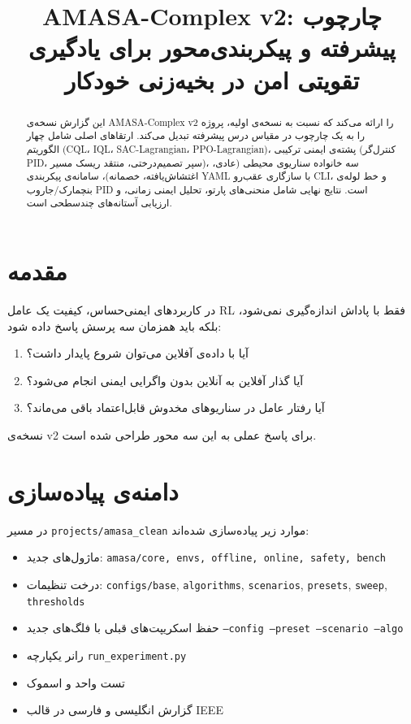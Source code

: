 \documentclass[conference]{IEEEtran}
\title{AMASA-Complex v2: چارچوب پیشرفته و پیکربندی‌محور برای یادگیری تقویتی امن در بخیه‌زنی خودکار}
\author{
\IEEEauthorblockN{Codex}
\IEEEauthorblockA{\texttt{/Users/tahamajs/Documents/uni/DRL/projects/amasa\_clean}}
}
\begin{document}
\maketitle

\begin{abstract}
این گزارش نسخه‌ی AMASA-Complex v2 را ارائه می‌کند که نسبت به نسخه‌ی اولیه، پروژه را به یک چارچوب در مقیاس درس پیشرفته تبدیل می‌کند. ارتقاهای اصلی شامل چهار الگوریتم (CQL، IQL، SAC-Lagrangian، PPO-Lagrangian)، پشته‌ی ایمنی ترکیبی (کنترل‌گر PID، سپر تصمیم‌درختی، منتقد ریسک مسیر)، سه خانواده سناریوی محیطی (عادی، اغتشاش‌یافته، خصمانه)، سامانه‌ی پیکربندی YAML با سازگاری عقب‌رو CLI، و خط لوله‌ی بنچمارک/جاروب PID است. نتایج نهایی شامل منحنی‌های پارتو، تحلیل ایمنی زمانی، و ارزیابی آستانه‌های چندسطحی است.
\end{abstract}

\section{مقدمه}
در کاربردهای ایمنی‌حساس، کیفیت یک عامل RL فقط با پاداش اندازه‌گیری نمی‌شود، بلکه باید همزمان سه پرسش پاسخ داده شود:
\begin{enumerate}
  \item آیا با داده‌ی آفلاین می‌توان شروع پایدار داشت؟
  \item آیا گذار آفلاین به آنلاین بدون واگرایی ایمنی انجام می‌شود؟
  \item آیا رفتار عامل در سناریوهای مخدوش قابل‌اعتماد باقی می‌ماند؟
\end{enumerate}

نسخه‌ی v2 برای پاسخ عملی به این سه محور طراحی شده است.

\section{دامنه‌ی پیاده‌سازی}
در مسیر \texttt{projects/amasa\_clean} موارد زیر پیاده‌سازی شده‌اند:
\begin{itemize}
  \item ماژول‌های جدید: \texttt{amasa/core, envs, offline, online, safety, bench}
  \item درخت تنظیمات: \texttt{configs/base}, \texttt{algorithms}, \texttt{scenarios}, \texttt{presets}, \texttt{sweep}, \texttt{thresholds}
  \item حفظ اسکریپت‌های قبلی با فلگ‌های جدید \texttt{--config --preset --scenario --algo}
  \item رانر یکپارچه \texttt{run\_experiment.py}
  \item تست واحد و اسموک
  \item گزارش انگلیسی و فارسی در قالب IEEE
\end{itemize}
\end{document}
